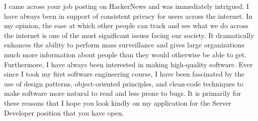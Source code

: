 I came across your job posting on HackerNews and was immediately intrigued.
I have always been in support of consistent privacy for users across the internet.
In my opinion, the ease at which other people can track and see what we do across the internet is one of the most significant issues facing our society.  
It dramatically enhances the ability to perform mass surveillance and gives large organizations much more information about people than they would otherwise be able to get.
Furthermore, I have always been interested in making high-quality software.  
Ever since I took my first software engineering course, I have been fascinated by the use of design patterns, object-oriented principles, and clean-code techniques to make software more natural to read and less prone to bugs.  
It is primarily for these reasons that I hope you look kindly on my application for the Server Developer position that you have open.